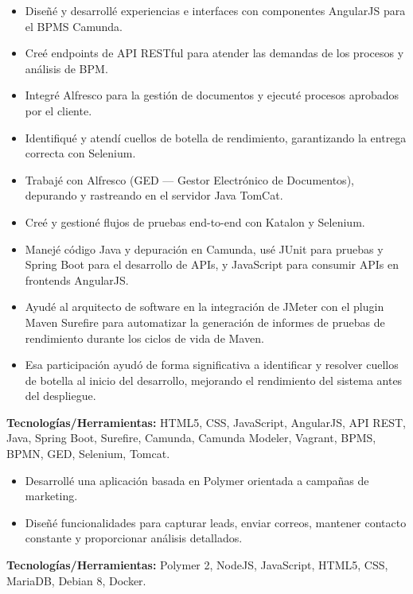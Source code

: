 \documentclass[10pt,a4paper]{altacv}
\begin{document}
\begin{itemize}
    \setlength{\itemindent}{0.5em}
    \item[--] Diseñé y desarrollé experiencias e interfaces con componentes AngularJS para el BPMS Camunda.
    \item[--] Creé endpoints de API RESTful para atender las demandas de los procesos y análisis de BPM.
    \item[--] Integré Alfresco para la gestión de documentos y ejecuté procesos aprobados por el cliente.
    \item[--] Identifiqué y atendí cuellos de botella de rendimiento, garantizando la entrega correcta con Selenium.
    \item[--] Trabajé con Alfresco (GED — Gestor Electrónico de Documentos), depurando y rastreando en el servidor Java TomCat.
    \item[--] Creé y gestioné flujos de pruebas end-to-end con Katalon y Selenium.
    \item[--] Manejé código Java y depuración en Camunda, usé JUnit para pruebas y Spring Boot para el desarrollo de APIs, y JavaScript para consumir APIs en frontends AngularJS.
    \item[--] Ayudé al arquitecto de software en la integración de JMeter con el plugin Maven Surefire para automatizar la generación de informes de pruebas de rendimiento durante los ciclos de vida de Maven.
    \item[--] Esa participación ayudó de forma significativa a identificar y resolver cuellos de botella al inicio del desarrollo, mejorando el rendimiento del sistema antes del despliegue.
\end{itemize}
\textbf{Tecnologías/Herramientas:} HTML5, CSS, JavaScript, AngularJS, API REST, Java, Spring Boot, Surefire, Camunda, Camunda Modeler, Vagrant, BPMS, BPMN, GED, Selenium, Tomcat.
\vspace{5mm}

\begin{itemize}
    \setlength{\itemindent}{0.5em}
    \item[--] Desarrollé una aplicación basada en Polymer orientada a campañas de marketing.
    \item[--] Diseñé funcionalidades para capturar leads, enviar correos, mantener contacto constante y proporcionar análisis detallados.
\end{itemize}
\textbf{Tecnologías/Herramientas:} Polymer 2, NodeJS, JavaScript, HTML5, CSS, MariaDB, Debian 8, Docker.
\vspace{5mm}
\end{document}
